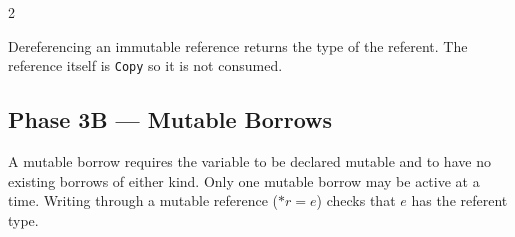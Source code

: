 \vspace{0.5em}
\begin{multicols}{2}

    \begin{prooftree}
    \end{prooftree}

    \columnbreak

    \begin{prooftree}
    \end{prooftree}

\end{multicols}

\vspace{0.5em}
Dereferencing an immutable reference returns the type of the referent.
The reference itself is \texttt{Copy} so it is not consumed.

\begin{prooftree}
\end{prooftree}

\subsection*{Phase 3B --- Mutable Borrows}

A mutable borrow requires the variable to be declared mutable and to have
no existing borrows of either kind.
Only one mutable borrow may be active at a time.
Writing through a mutable reference ($*r = e$) checks that $e$ has the
referent type.


